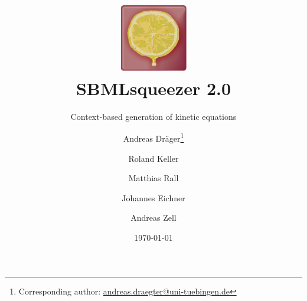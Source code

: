 \documentclass[
  BCOR12mm,
  letterpaper,
  11pt,
  headsepline,
  pointlessnumbers,
  tablecaptionabove,
  onelinecaption,
  headinclude,
  appendixprefix,
  idxtotoc,
  bibtotoc,
  twoside,
  titlepage
]{scrreprt}
\title{
\includegraphics[width=3cm]{img/LOGO.png}\\%
SBMLsqueezer 2.0
}
\subtitle{Context-based generation of kinetic equations}
\author{Andreas Dr\"ager\thanks{Corresponding author:
\href{mailto:andreas.draeger@uni-tuebingen.de}{andreas.draegter@uni-tuebingen.de}}\and
Roland Keller\and
Matthias Rall\and
Johannes Eichner\and
Andreas Zell}
\date{\today}
\begin{document}
% 
% 
%
\maketitle
\begin{abstract}

\end{abstract}
%
\setcounter{tocdepth}{1}
\tableofcontents		%

\cleardoublepage		%


% 
% 
% 
% 
% 






\end{document}

